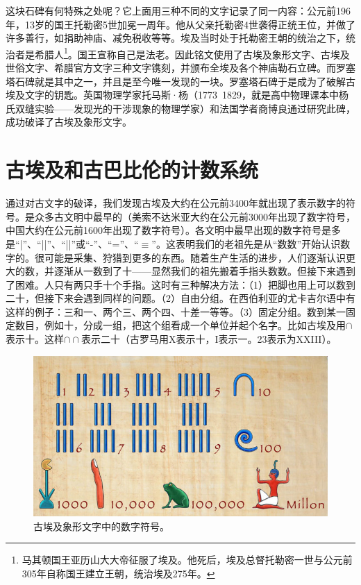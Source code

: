 \documentclass[b5paper]{ctexart}
\begin{document}
这块石碑有何特殊之处呢？它上面用三种不同的文字记录了同一内容：公元前196年，13岁的国王托勒密5世加冕一周年。他从父亲托勒密4世袭得正统王位，并做了许多善行，如捐助神庙、减免税收等等。埃及当时处于托勒密王朝的统治之下，统治者是希腊人\footnote{马其顿国王亚历山大大帝征服了埃及。他死后，埃及总督托勒密一世与公元前305年自称国王建立王朝，统治埃及275年。}。国王宣称自己是法老。因此铭文使用了古埃及象形文字、古埃及世俗文字、希腊官方文字三种文字镌刻，并颁布全埃及各个神庙勒石立碑。而罗塞塔石碑就是其中之一，并且是至今唯一发现的一块。罗塞塔石碑于是成为了破解古埃及文字的钥匙。英国物理学家托马斯·杨（1773~1829，就是高中物理课本中杨氏双缝实验——发现光的干涉现象的物理学家）和法国学者商博良通过研究此碑，成功破译了古埃及象形文字\cite{BM-RS-17}。

\section{古埃及和古巴比伦的计数系统}

通过对古文字的破译，我们发现古埃及大约在公元前3400年就出现了表示数字的符号。是众多古文明中最早的（美索不达米亚大约在公元前3000年出现了数字符号，中国大约在公元前1600年出现了数字符号）。各文明中最早出现的数字符号是多是“|”、“||”、“||”或“-”、“=”、“$\equiv$”。这表明我们的老祖先是从“数数”开始认识数字的。很可能是采集、狩猎到更多的东西。随着生产生活的进步，人们逐渐认识更大的数，并逐渐从一数到了十——显然我们的祖先搬着手指头数数。但接下来遇到了困难。人只有两只手十个手指。这时有三种解决方法：（1）把脚也用上可以数到二十，但接下来会遇到同样的问题。（2）自由分组。在西伯利亚的尤卡吉尔语中有这样的例子：三和一、两个三、两个四、十差一等等。（3）固定分组。数到某一固定数目，例如十，分成一组，把这个组看成一个单位并起个名字。比如古埃及用$\cap$表示十。这样$\cap \cap$表示二十（古罗马用X表示十，I表示一。23表示为XXIII）。

\begin{figure}[htbp]
 \centering
 \includegraphics[scale=0.8]{img/hieroglyphic-numbers}
 \caption{古埃及象形文字中的数字符号。}
 \label{fig:egypt-hieroglyphic-numerals}
\end{figure}
\end{document}
